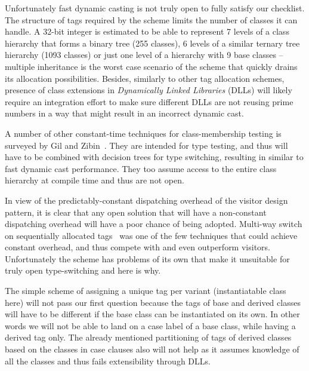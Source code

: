 \documentclass[preprint]{sigplanconf}
\begin{document}
Unfortunately fast dynamic casting is not truly open to fully satisfy our 
checklist. The structure of tags required by the scheme limits the number of 
classes it can handle. A 32-bit integer is estimated to be able to represent 7 
levels of a class hierarchy that forms a binary tree (255 classes), 6 levels of 
a similar ternary tree hierarchy (1093 classes) or just one level of a hierarchy 
with 9 base classes -- multiple inheritance is the worst case scenario of the 
scheme that quickly drains its allocation possibilities. Besides, similarly to 
other tag allocation schemes, presence of class extensions in \emph{Dynamically Linked Libraries} (DLLs) will likely 
require an integration effort to make sure different DLLs are not reusing prime 
numbers in a way that might result in an incorrect dynamic cast.

A number of other constant-time techniques for class-membership testing is 
surveyed by Gil and Zibin~\cite[]{PQEncoding}. They are intended 
for type testing, and thus will have to be combined with decision trees 
for type switching, resulting in similar to fast dynamic cast performance. 
They too assume access to the entire class hierarchy at compile time and thus 
are not open.

In view of the predictably-constant dispatching overhead of the visitor design pattern, 
it is clear that any open solution that will have a non-constant dispatching 
overhead will have a poor chance of being adopted. Multi-way switch on 
sequentially allocated tags~\cite{Spuler94} was one of the few techniques that 
could achieve constant overhead, and thus compete with and even outperform visitors. 
Unfortunately the scheme has problems of its own that make it unsuitable for 
truly open type-switching and here is why.



The simple scheme of assigning a unique tag per variant (instantiatable class 
here) will not pass our first question because the tags of base and derived 
classes will have to be different if the base class can be instantiated on its 
own. In other words we will not be able to land on a case label of a base class, while 
having a derived tag only. The already mentioned partitioning of tags of derived 
classes based on the classes in case clauses also will not help as it assumes 
knowledge of all the classes and thus fails extensibility through DLLs.
\end{document}
